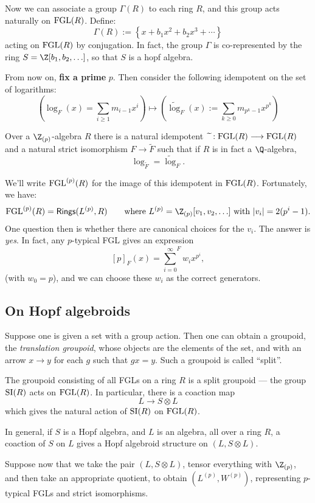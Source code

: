 \documentclass[11pt]{article}
\begin{document}
\begin{Formal Group Laws}
\begin{shaded}
Now we can associate a group $\Gamma(R)$ to each ring $R$, and this group acts naturally on $\textup{FGL}(R)$. Define:
\[\Gamma(R):=\left\{x+b_1x^2+b_2x^3+\cdots\right\}\]
acting on $\textup{FGL}(R)$ by conjugation.
 In fact, the group $\Gamma$ is co-represented by the ring $S=\Z[b_1,b_2,\ldots]$, so that $S$ is a hopf algebra.

From now on, \textbf{fix a prime} $p$. Then consider the following idempotent on the set of logarithms:
\[\left(\log_F(x)=\sum_{i\geq1}m_{i-1}x^{i}\right) \mapsto
\left(\widetilde{\log}_F(x):= \sum_{k\geq0}m_{p^k-1}x^{p^k}\right)\]
\begin{thm*}
Over a $\Z_{(p)}$-algebra $R$ there is a natural idempotent\ $\widetilde{\,\,}:\textup{FGL}(R)\longrightarrow\textup{FGL}(R)$ and a natural strict isomorphism $F\to\widetilde{F}$ such that if $R$ is in fact a $\Q$-algebra,
\[\log_{\widetilde{F}}=\widetilde{\log}_F.\]
\end{thm*}
We'll write $\textup{FGL}^{(p)}(R)$ for the image of this idempotent in $\textup{FGL}(R)$. Fortunately, we have:
\[\FGLp(R)=\Rings(L^{(p)},R)\textup{\qquad where }L^{(p)}=\Z_{(p)}[v_1,v_2,\ldots]\textup{ with }|v_i|=2(p^i-1).\]
One question then is whether there are canonical choices for the $v_i$. The answer is \emph{yes}. In fact, any $p$-typical FGL gives an expression
\[[p]_F(x)={\sum_{i=0}^{\infty}}^Fw_ix^{p^i},\]
(with $w_0=p$), and we can choose these $w_i$ as the correct generators.
\subsection*{On Hopf algebroids}
Suppose one is given a set with a group action. Then one can obtain a groupoid, the \emph{translation groupoid}, whose objects are the elements of the set, and with an arrow $x\to y$ for each $g$ such that $gx=y$. Such a groupoid is called ``split''.

The groupoid consisting of all FGLs on a ring $R$ is a split groupoid --- the group $\textup{SI}(R)$ acts on $\textup{FGL}(R)$. In particular, there is a coaction map
\[L\to S\otimes L\]
which gives the natural action of $\textup{SI}(R)$ on $\textup{FGL}(R)$.

In general, if $S$ is a Hopf algebra, and $L$ is an algebra, all over a ring $R$, a coaction of $S$ on $L$ gives a Hopf algebroid structure on $(L,S\otimes L)$.

Suppose now that we take the pair $(L,S\otimes L)$, tensor everything with $\Z_{(p)}$, and then take an appropriate quotient, to obtain $(L^{(p)},W^{(p)})$, representing $p$-typical FGLs and strict isomorphisms.


\end{shaded}
\end{Formal Group Laws}
\end{document}
